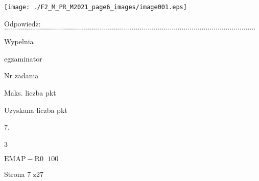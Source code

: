 \documentclass[a4paper,12pt]{article}
\begin{document}
\begin{center}
\texttt{[image: ./F2\_M\_PR\_M2021\_page6\_images/image001.eps]}
\end{center}
$\mathrm{O}\mathrm{d}\mathrm{p}\mathrm{o}\mathrm{w}\mathrm{i}\mathrm{e}\mathrm{d}\acute{\mathrm{z}}$:$\ldots\ldots\ldots\ldots\ldots\ldots\ldots\ldots\ldots\ldots\ldots\ldots\ldots\ldots\ldots\ldots\ldots\ldots\ldots\ldots\ldots\ldots\ldots\ldots\ldots\ldots\ldots\ldots\ldots\ldots\ldots\ldots\ldots\ldots\ldots\ldots\ldots\ldots\ldots\ldots\ldots\ldots$

Wypelnia

egzaminator

Nr zadania

Maks. liczba pkt

Uzyskana liczba pkt

7.

3

$\mathrm{E}\mathrm{M}\mathrm{A}\mathrm{P}-\mathrm{R}0_{-}100$

Strona 7 z27
\end{document}
